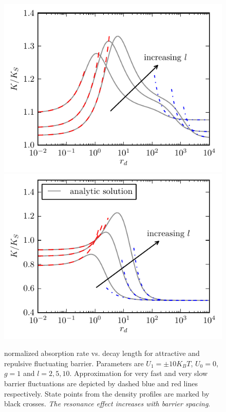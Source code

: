 \documentclass[twocolumn,superscriptaddress]{revtex4}
\begin{document}
\begin{figure}[H]
\includegraphics[width= .5 \textwidth]{plots/l2_ab_rates.pdf}
\includegraphics[width= .5 \textwidth]{plots/l2_rb_rates.pdf}
\caption{normalized absorption rate vs. decay length for attractive and repulsive fluctuating barrier. \newline Parameters are $U_1 = \pm 10 K_B T$, $U_0= 0$, $g = 1$ and $l=2,5,10$. Approximation for very fast and very slow barrier fluctuations are depicted by dashed blue and red lines respectively. State points from the density profiles are marked by black crosses. \emph{The resonance effect increases with barrier spacing}.}
\label{fig3b}
\end{figure}
\end{document}
